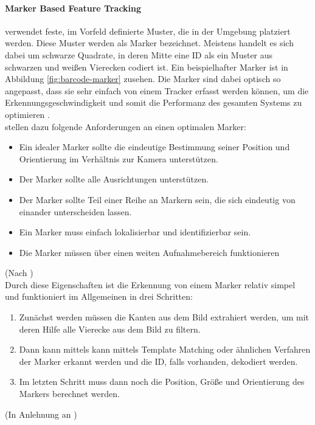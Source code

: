 \paragraph{Marker Based Feature Tracking} verwendet feste, im Vorfeld definierte Muster, die in der Umgebung platziert werden. Diese Muster werden als Marker bezeichnet. Meistens handelt es sich dabei um schwarze Quadrate, in deren Mitte eine ID als ein Muster aus schwarzen und weißen Vierecken codiert ist. Ein beispielhafter Marker ist in Abbildung \ref{fig:barcode-marker} zusehen.
Die Marker sind dabei optisch so angepasst, dass sie sehr einfach von einem Tracker erfasst werden können, um die Erkennungsgeschwindigkeit und somit die Performanz des gesamten Systems zu optimieren \citep[S. 28]{mehler-bicher:augmented-reality}.\\
\citeauthor{owen:fiducial-marker} stellen dazu folgende Anforderungen an einen optimalen Marker:
\begin{itemize}
\item Ein idealer Marker sollte die eindeutige Bestimmung seiner Position und Orientierung im Verhältnis zur Kamera unterstützen.
\item Der Marker sollte alle Ausrichtungen unterstützen.
\item Der Marker sollte Teil einer Reihe an Markern sein, die sich eindeutig von einander unterscheiden lassen.
\item Ein Marker muss einfach lokalisierbar und identifizierbar sein.
\item Die Marker müssen über einen weiten Aufnahmebereich funktionieren
\end{itemize}
(Nach \citet[S. 2]{owen:fiducial-marker})\\
Durch diese Eigenschaften ist die Erkennung von einem Marker relativ simpel und funktioniert im Allgemeinen in drei Schritten:
\begin{enumerate}
\item Zunächst werden müssen die Kanten aus dem Bild extrahiert werden, um mit deren Hilfe alle Vierecke aus dem Bild zu filtern.
\item Dann kann mittels kann mittels Template Matching oder ähnlichen Verfahren der Marker erkannt werden und die ID, falls vorhanden, dekodiert werden.
\item Im letzten Schritt muss dann noch die Position, Größe und Orientierung des Markers berechnet werden.
\end{enumerate}
(In Anlehnung an \citet{cukovic:marker-vs-natural})

